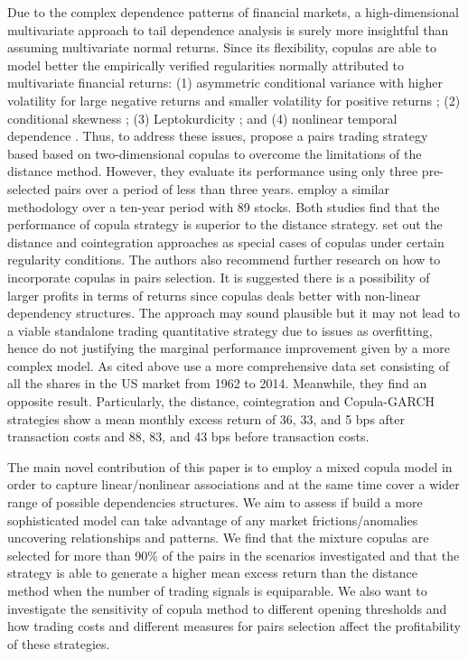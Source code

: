 \documentclass[a4paper]{article}
\begin{document}
Due to the complex dependence patterns of financial markets, a high-dimensional multivariate approach to tail dependence analysis is surely more insightful than assuming multivariate normal returns. Since its flexibility, copulas are able to model better the empirically verified regularities normally attributed to multivariate financial returns: (1) asymmetric conditional variance with higher volatility for large negative returns and smaller volatility for positive returns \citep{h98}; (2) conditional skewness \citep{ait01,chen01,patton01}; (3) Leptokurdicity \citep{t01,andreou01}; and (4) nonlinear temporal dependence \citep{cont01,campbell97}. Thus, to address these issues, \citet*{lw2013} propose a pairs trading strategy based based on two-dimensional copulas to overcome the limitations of the distance method. However, they evaluate its performance using only three pre-selected pairs over a period of less than three years. \citet*{xie14} employ a similar methodology over a ten-year period with 89 stocks. Both studies find that the performance of copula strategy is superior to the distance strategy. \citet*{xw13} set out the distance and cointegration approaches as special cases of copulas under certain regularity conditions. The authors also recommend further research on how to incorporate copulas in pairs selection. It is suggested there is a possibility of larger profits in terms of returns since copulas deals better with non-linear dependency structures. The approach may sound plausible but it may not lead to a viable standalone trading quantitative strategy due to issues as overfitting, hence do not justifying the marginal performance improvement given by a more complex model. As cited above \citet*{rf15} use a more comprehensive data set consisting of all the shares in the US market from 1962 to 2014. Meanwhile, they find an opposite result. Particularly, the distance, cointegration and Copula-GARCH strategies show a mean monthly excess return of 36, 33, and 5 bps after transaction costs and 88, 83, and 43 bps before transaction costs.

The main novel contribution of this paper is to employ a mixed copula model in order to capture linear/nonlinear associations and at the same time cover a wider range of possible dependencies structures. We aim to assess if build a more sophisticated model can take advantage of any market frictions/anomalies uncovering relationships and patterns. We find that the mixture copulas are selected for more than 90\% of the pairs in the scenarios investigated and that the strategy is able 
to generate a higher mean excess return than the distance method when the 
number of trading signals is equiparable. We also want to investigate the sensitivity of copula method to different opening thresholds and how trading costs and different measures for pairs selection affect the profitability of these strategies.
\end{document}
